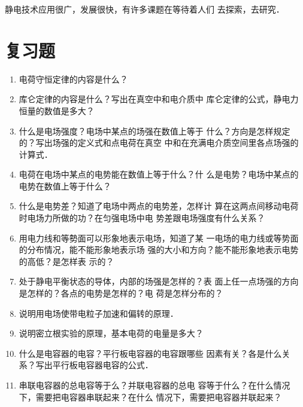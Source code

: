 静电技术应用很广，发展很快，有许多课题在等待着人们
去探索，去研究．

\section*{复习题}
\begin{enumerate}
\item 电荷守恒定律的内容是什么？
\item 库仑定律的内容是什么？写出在真空中和电介质中
库仑定律的公式，静电力恒量的数值是多大？
\item 什么是电场强度？电场中某点的场强在数值上等于
什么？方向是怎样规定的？写出场强的定义式和点电荷在真空
中和在充满电介质空间里各点场强的计算式．
\item 电荷在电场中某点的电势能在数值上等于什么？什
么是电势？电场中某点的电势在数值上等于什么？
\item 什么是电势差？知道了电场中两点的电势差，怎样计
算在这两点间移动电荷时电场力所做的功？在匀强电场中电
势差跟电场强度有什么关系？
\item 用电力线和等勢面可以形象地表示电场，知道了某
一电场的电力线或等势面的分布情况，能不能形象地表示场
强的大小和方向？能不能形象地表示电势的高低？是怎样表
示的？
\item 处于静电平衡状态的导体，内部的场强是怎样的？表
面上任一点场强的方向是怎样的？各点的电势是怎样的？电
荷是怎样分布的？
\item 说明用电场使带电粒子加速和偏转的原理．
\item 说明密立根实验的原理，基本电荷的电量是多大？
\item 什么是电容器的电容？平行板电容器的电容跟哪些
因素有关？各是什么关系？写出平行板电容器电容的公式．
\item 串联电容器的总电容等于么？并联电容器的总电
容等于什么？在什么情况下，需要把电容器串联起来？在什么
情况下，需要把电容器并联起来？
\end{enumerate}

